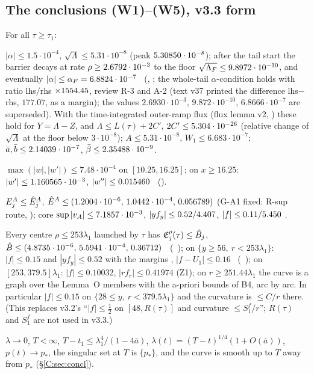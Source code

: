 \documentclass[11pt]{article}
\begin{document}
\subsection{The conclusions (W1)--(W5), v3.3 form}\label{C:sec:W}
For all $\tau\ge\tau_1$:
\begin{description}[leftmargin=1.2em]
\item[(W1) trapping] $|\alpha|\le1.5\cdot10^{-4}$, $\sqrt\Lambda\le5.31\cdot10^{-8}$ (peak $5.30850\cdot10^{-8}$); after the tail start the barrier decays at rate $\rho\ge2.6792\cdot10^{-3}$ to the floor $\sqrt{\Lambda_F}\le9.8972\cdot10^{-10}$, and eventually $|\alpha|\le\alpha_F=6.8824\cdot10^{-7}$ \tC\ (\SV, ; the whole-tail $\alpha$-condition holds with ratio lhs$/$rhs $\times1554.45$, review R-3 and A-2 (text v37 printed the difference lhs$-$rhs, $177.07$, as a margin); the  values $2.6930\cdot10^{-3}$, $9.872\cdot10^{-10}$, $6.8666\cdot10^{-7}$ are superseded). With the time-integrated outer-ramp flux (flux lemma v2, ) these hold for $Y=\Lambda-Z$, and $\Lambda\le L(\tau)+2C'$, $2C'\le5.304\cdot10^{-26}$ (relative change of $\sqrt\Lambda$ at the floor below $3\cdot10^{-8}$); $A\le5.31\cdot10^{-8}$, $W_1\le6.683\cdot10^{-7}$; $\bar a,\bar b\le2.14039\cdot10^{-7}$, $\bar\beta\le2.35488\cdot10^{-9}$.
\item[(W2) tip] $\max(|w|,|w'|)\le7.48\cdot10^{-4}$ on $[10.25,16.25]$; on $x\ge16.25$: $|w'|\le1.160565\cdot10^{-3}$, $|w''|\le0.015460$ \tC\ (\SV).
\item[(W3) shells] $E^A_j\le\hat E^A_j$, $\hat E^A\le(1.2004\cdot10^{-6},\,1.0442\cdot10^{-4},\,0.056789)$ (G-A1 fixed: R-sup route, ); core $\sup|v_A|\le7.1857\cdot10^{-3}$, $|yf_y|\le0.52/4.407$, $|f|\le0.11/5.450$ \tC\tB.
\item[(W4) far field] Every centre $\rho\le253\lambda_1$ launched by $\tau$ has $\mathfrak E^\rho_j(\tau)\le\hat B_j$, $\hat B\le(4.8735\cdot10^{-6},\,5.5941\cdot10^{-4},\,0.36712)$ \tC\ (\SU\ ); on $\{y\ge56,\ r<253\lambda_1\}$: $|f|\le0.15$ and $|yf_y|\le0.52$ with the margins \UmarV, $|f-U_1|\le0.16$ \tC\ (\SU\ ); on $[253,379.5]\lambda_1$: $|f|\le0.10032$, $|rf_r|\le0.41974$ (Z1); on $r\ge251.44\lambda_1$ the curve is a graph over the Lemma~O members with the a-priori bounds of B4, arc by arc. In particular $|f|\le0.15$ on $\{28\le y,\ r<379.5\lambda_1\}$ and the curvature is $\le C/r$ there. (This replaces v3.2's ``$|f|\le\frac12$ on $[48,R(\tau)]$ and curvature $\le S_1^f/r$''; $R(\tau)$ and $S_1^f$ are not used in v3.3.)
\item[(W5) consequences] $\lambda\to0$, $T<\infty$, $T-t_1\le\lambda_1^4/(1-4\bar a)$, $\lambda(t)=(T-t)^{1/4}(1+O(\bar a))$, $p(t)\to p_*$, the singular set at $T$ is $\{p_*\}$, and the curve is smooth up to $T$ away from $p_*$ (\S\ref{C:sec:concl}).
\end{description}
\end{document}

